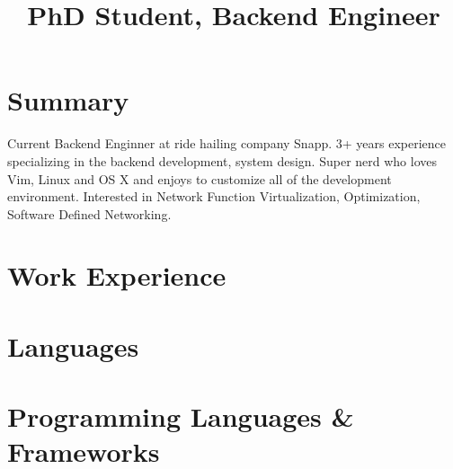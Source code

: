 \documentclass[11pt, a4paper, color, final]{moderncv}
\title{PhD Student, Backend Engineer}
\begin{document}
\maketitle

\section{Summary}\closesection{}
Current Backend Enginner at ride hailing company Snapp.
3+ years experience specializing in the backend development, system design.
Super nerd who loves Vim, Linux and OS X and enjoys to customize all of the development environment.
Interested in Network Function Virtualization, Optimization, Software Defined Networking.

\section{Work Experience}

\section{Languages}

\section{Programming Languages \& Frameworks}




\end{document}

